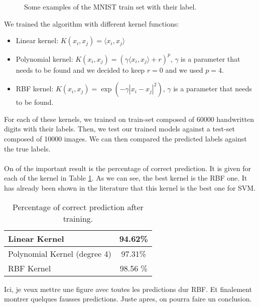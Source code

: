 \documentclass[a4paper, 11pt]{article}
\begin{document}
\begin{figure}[H]
\centering

\caption{\label{fig:train-set} Some examples of the MNIST train set with their label.}
\end{figure}

We trained the algorithm with different kernel functions:
\begin{itemize}
\item Linear kernel: $K(x_i,x_j) = \langle x_i, x_j \rangle$
\item Polynomial kernel: $K(x_i,x_j) = (\gamma \langle x_i, x_j \rangle + r)^p$, $\gamma$ is a parameter that needs to be found and we decided to keep $r=0$ and we used $p=4$.
\item RBF kernel:  $K(x_i,x_j) = \exp(-\gamma|x_i-x_j|^2)$, $\gamma$ is a parameter that needs to be found.
\end{itemize} 

For each of these kernels, we trained on train-set composed of 60000 handwritten digits with their labels. Then, we test our trained models against a test-set composed of 10000 images. We can then compared the predicted labels against the true labels. 
\\\\
On of the important result is the percentage of correct prediction. It is given for each of the kernel in Table \ref{tab:results}. As we can see, the best kernel is the RBF one. It has already been shown in the literature that this kernel is the best one for SVM.
\begin{table}[H]
\centering
\begin{tabular}{|l|c|}
\hline
Linear Kernel & 94.62\% \\\hline
Polynomial Kernel (degree 4) & 97.31\% \\\hline
RBF Kernel & 98.56 \% \\ \hline
\end{tabular}
\caption{\label{tab:results} Percentage of correct prediction after training.}
\end{table}

{\color{red} Ici, je veux mettre une figure avec toutes les predictions dur RBF. Et finalement montrer quelques fausses predictions. Juste apres, on pourra faire un conclusion.}
\end{document}

